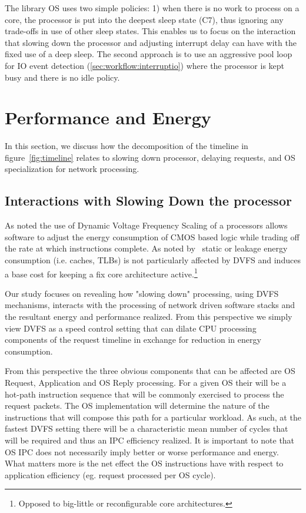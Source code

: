 The library OS uses two simple policies: 1) when there is no work to process on a core, the processor is put into the deepest sleep state (C7), thus ignoring any trade-offs in use of other sleep states.  This enables us to focus on the interaction that slowing down the processor and adjusting interrupt delay can have with the fixed use of a deep sleep. The second approach is to use an aggressive pool loop for IO event detection (\cref{sec:workflow:interruptio}) where the processor is kept busy and there is no idle policy. 

\section{Performance and Energy}
\label{sec:slowdown}
In this section, we discuss how the decomposition of the timeline in figure~\ref{fig:timeline} relates to slowing down processor, delaying requests, and OS specialization for network processing.

\subsection{Interactions with Slowing Down the processor}
\label{sec:workflow:dvfs}

As noted the use of Dynamic Voltage Frequency Scaling of a processors allows software to adjust the energy consumption of CMOS based logic while trading off the rate at which instructions complete.  As noted by~\cite{slowdownorsleep, 10.1109/40.888701, pacingtoidle, udpm} static or leakage energy consumption (i.e. caches, TLBs) is not particularly affected by DVFS and induces a base cost for keeping a fix core architecture active.\footnote{Opposed to big-little or reconfigurable core architectures.}

Our study focuses on revealing how "slowing down" processing, using DVFS mechanisms, interacts with the processing of network driven software stacks and the resultant energy and performance realized. From this perspective we simply view DVFS as a speed control setting that can dilate CPU processing components of the request timeline in exchange for reduction in energy consumption.

From this perspective the three obvious components that can be affected are OS Request, Application and OS Reply processing. For a given OS their will be a hot-path instruction sequence that will be commonly exercised to process the request packets.  The OS implementation will determine the nature of the instructions that will compose this path for a particular workload.  As such, at the fastest DVFS setting there will be a characteristic mean number of cycles that will be required and thus an IPC efficiency realized.  It is important to note that OS IPC does not necessarily imply better or worse performance and energy. What matters more is the net effect the OS instructions have with respect to application efficiency (eg. request processed per OS cycle). %





